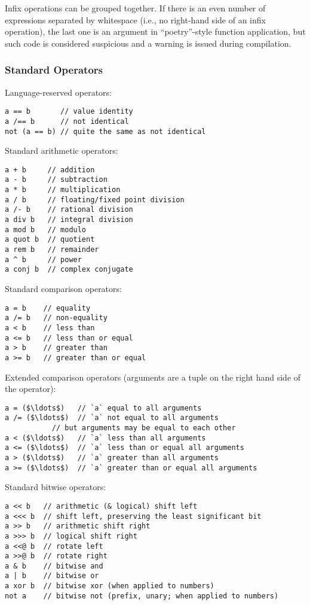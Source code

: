 Infix operations can be grouped together. If there is an even number of expressions separated by whitespace (i.e., no right-hand side of an infix operation), the last one is an argument in ``poetry''-style function application, but such code is considered suspicious and a warning is issued during compilation. 




\subsubsection{Standard Operators}

Language-reserved operators:
\begin{lstlisting}
a == b       // value identity
a /== b      // not identical
not (a == b) // quite the same as not identical
\end{lstlisting}

Standard arithmetic operators:
\begin{lstlisting}
a + b     // addition
a - b     // subtraction
a * b     // multiplication
a / b     // floating/fixed point division
a /- b    // rational division
a div b   // integral division
a mod b   // modulo
a quot b  // quotient
a rem b   // remainder
a ^ b     // power
a conj b  // complex conjugate
\end{lstlisting}

Standard comparison operators:
\begin{lstlisting}
a = b    // equality
a /= b   // non-equality
a < b    // less than
a <= b   // less than or equal
a > b    // greater than
a >= b   // greater than or equal
\end{lstlisting}

Extended comparison operators (arguments are a tuple on the right hand side of the operator):
\begin{lstlisting}
a = ($\ldots$)   // `a` equal to all arguments
a /= ($\ldots$)  // `a` not equal to all arguments
           // but arguments may be equal to each other
a < ($\ldots$)   // `a` less than all arguments
a <= ($\ldots$)  // `a` less than or equal all arguments
a > ($\ldots$)   // `a` greater than all arguments
a >= ($\ldots$)  // `a` greater than or equal all arguments
\end{lstlisting}

Standard bitwise operators: 
\begin{lstlisting}
a << b   // arithmetic (& logical) shift left
a <<< b  // shift left, preserving the least significant bit
a >> b   // arithmetic shift right
a >>> b  // logical shift right
a <<@ b  // rotate left
a >>@ b  // rotate right
a & b    // bitwise and
a | b    // bitwise or
a xor b  // bitwise xor (when applied to numbers)
not a    // bitwise not (prefix, unary; when applied to numbers)
\end{lstlisting}

